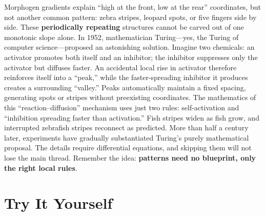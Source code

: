 \begin{tiaozhan}
Morphogen gradients explain ``high at the front, low at the rear'' coordinates, but not another common pattern: zebra stripes, leopard spots, or five fingers side by side. These \textbf{periodically repeating} structures cannot be carved out of one monotonic slope alone. In 1952, mathematician Turing---yes, the Turing of computer science---proposed an astonishing solution. Imagine two chemicals: an activator promotes both itself and an inhibitor; the inhibitor suppresses only the activator but diffuses faster. An accidental local rise in activator therefore reinforces itself into a ``peak,'' while the faster-spreading inhibitor it produces creates a surrounding ``valley.'' Peaks automatically maintain a fixed spacing, generating spots or stripes without preexisting coordinates. The mathematics of this ``reaction--diffusion'' mechanism uses just two rules: self-activation and ``inhibition spreading faster than activation.'' Fish stripes widen as fish grow, and interrupted zebrafish stripes reconnect as predicted. More than half a century later, experiments have gradually substantiated Turing's purely mathematical proposal. The details require differential equations, and skipping them will not lose the main thread. Remember the idea: \textbf{patterns need no blueprint, only the right local rules}.
\end{tiaozhan}

\section*{Try It Yourself}

